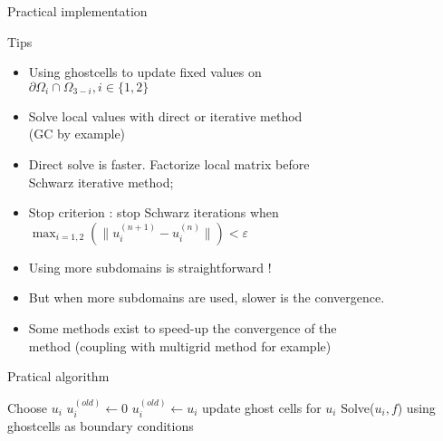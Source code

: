 \documentclass[compress,10pt,aspectratio=169]{beamer}
\begin{document}
\begin{frame}[fragile]{Practical implementation}
  \scriptsize
  \begin{multicols}{2}
  \begin{block}{\small Tips}
    \begin{itemize}
      \item Using ghostcells to update fixed values on\\ $\partial\Omega_{i} \cap \Omega_{3-i}, i\in\{1,2\}$
      \item Solve local values with direct or iterative method\\ (GC by example)
      \item Direct solve is faster. Factorize local matrix before\\ Schwarz iterative method;
      \item Stop criterion : stop Schwarz iterations when \\
      $\displaystyle\max_{i=1,2}\left(\|u_{i}^{(n+1)} - u_{i}^{(n)}\|\right) < \varepsilon$
      \item Using more subdomains is straightforward !
      \item But when more subdomains are used, slower is the convergence.
      \item Some methods exist to speed-up the convergence of the\\ method (coupling with multigrid method for example)
    \end{itemize}
  \end{block}

  \begin{exampleblock}{\small Pratical algorithm}
    \begin{algorithm}[H]
      Choose $u_{i}$\;
      $u_{i}^{(old)} \leftarrow 0$\;
       {
          $u_{i}^{(old)} \leftarrow u_{i}$\;
          update ghost cells for $u_{i}$\;
          Solve($u_{i}, f$) using ghostcells as boundary conditions\;
      }
    \end{algorithm}
  \end{exampleblock}
\end{multicols}
\end{frame}
\end{document}
